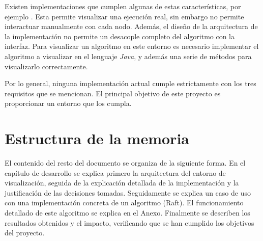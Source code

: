 Existen implementaciones que cumplen algunas de estas características, por ejemplo \cite{MOSES200497}. Esta permite visualizar una ejecución real, sin embargo no permite interactuar manualmente con cada nodo. Además, el diseño de la arquitectura de la implementación no permite un desacople completo del algoritmo con la interfaz. Para visualizar un algoritmo en este entorno es necesario implementar el algoritmo a visualizar en el lenguaje \textit{Java}, y además una serie de métodos para visualizarlo correctamente.

Por lo general, ninguna implementación actual cumple estrictamente con los tres requisitos que se mencionan. El principal objetivo de este proyecto es proporcionar un entorno que los cumpla.


\section{Estructura de la memoria}

El contenido del resto del documento se organiza de la siguiente forma. En el capítulo de desarrollo se explica primero la arquitectura del entorno de visualización, seguida de la explicación detallada de la implementación y la justificación de las decisiones tomadas. Seguidamente se explica un caso de uso con una implementación concreta de un algoritmo (Raft). El funcionamiento detallado de este algoritmo se explica en el Anexo. Finalmente se describen los resultados obtenidos y el impacto, verificando que se han cumplido los objetivos del proyecto.



